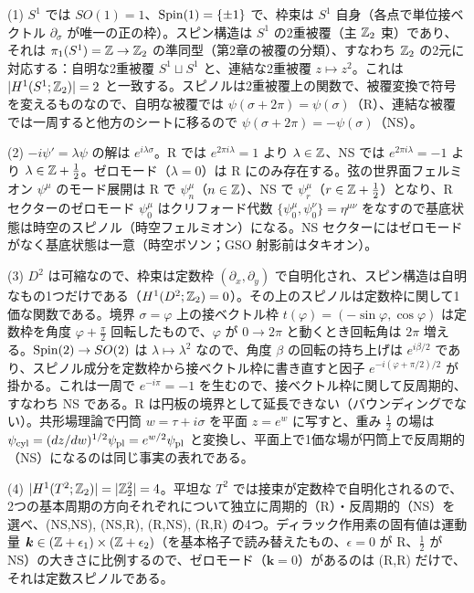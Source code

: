\begin{solution}
(1) $S^1$ では $SO(1)=1$、$\operatorname{Spin}(1)=\{\pm1\}$ で、枠束は $S^1$ 自身（各点で単位接ベクトル $\partial_\sigma$ が唯一の正の枠）。スピン構造は $S^1$ の2重被覆（主 $\mathbb{Z}_2$ 束）であり、それは $\pi_1(S^1)=\mathbb{Z}\to\mathbb{Z}_2$ の準同型（第2章の被覆の分類）、すなわち $\mathbb{Z}_2$ の2元に対応する：自明な2重被覆 $S^1\sqcup S^1$ と、連結な2重被覆 $z\mapsto z^2$。これは $\lvert H^1(S^1;\mathbb{Z}_2)\rvert=2$ と一致する。スピノルは2重被覆上の関数で、被覆変換で符号を変えるものなので、自明な被覆では $\psi(\sigma+2\pi)=\psi(\sigma)$（R）、連結な被覆では一周すると他方のシートに移るので $\psi(\sigma+2\pi)=-\psi(\sigma)$（NS）。

(2) $-i\psi'=\lambda\psi$ の解は $e^{i\lambda\sigma}$。R では $e^{2\pi i\lambda}=1$ より $\lambda\in\mathbb{Z}$、NS では $e^{2\pi i\lambda}=-1$ より $\lambda\in\mathbb{Z}+\tfrac12$。ゼロモード（$\lambda=0$）は R にのみ存在する。弦の世界面フェルミオン $\psi^\mu$ のモード展開は R で $\psi^\mu_n$（$n\in\mathbb{Z}$）、NS で $\psi^\mu_r$（$r\in\mathbb{Z}+\frac12$）となり、R セクターのゼロモード $\psi^\mu_0$ はクリフォード代数 $\{\psi_0^\mu,\psi_0^\nu\}=\eta^{\mu\nu}$ をなすので基底状態は時空のスピノル（時空フェルミオン）になる。NS セクターにはゼロモードがなく基底状態は一意（時空ボソン；GSO 射影前はタキオン）。

(3) $D^2$ は可縮なので、枠束は定数枠 $(\partial_x,\partial_y)$ で自明化され、スピン構造は自明なもの1つだけである（$H^1(D^2;\mathbb{Z}_2)=0$）。その上のスピノルは定数枠に関して1価な関数である。境界 $\sigma=\varphi$ 上の接ベクトル枠 $t(\varphi)=(-\sin\varphi,\cos\varphi)$ は定数枠を角度 $\varphi+\frac\pi2$ 回転したもので、$\varphi$ が $0\to2\pi$ と動くとき回転角は $2\pi$ 増える。$\operatorname{Spin}(2)\to SO(2)$ は $\lambda\mapsto\lambda^2$ なので、角度 $\beta$ の回転の持ち上げは $e^{i\beta/2}$ であり、スピノル成分を定数枠から接ベクトル枠に書き直すと因子 $e^{-i(\varphi+\pi/2)/2}$ が掛かる。これは一周で $e^{-i\pi}=-1$ を生むので、接ベクトル枠に関して反周期的、すなわち NS である。R は円板の境界として延長できない（バウンディングでない）。共形場理論で円筒 $w=\tau+i\sigma$ を平面 $z=e^w$ に写すと、重み $\frac12$ の場は $\psi_{\rm cyl}=(dz/dw)^{1/2}\psi_{\rm pl}=e^{w/2}\psi_{\rm pl}$ と変換し、平面上で1価な場が円筒上で反周期的（NS）になるのは同じ事実の表れである。

(4) $\lvert H^1(T^2;\mathbb{Z}_2)\rvert=\lvert\mathbb{Z}_2^2\rvert=4$。平坦な $T^2$ では接束が定数枠で自明化されるので、2つの基本周期の方向それぞれについて独立に周期的（R）・反周期的（NS）を選べ、(NS,NS), (NS,R), (R,NS), (R,R) の4つ。ディラック作用素の固有値は運動量 $\bm k\in(\mathbb{Z}+\epsilon_1)\times(\mathbb{Z}+\epsilon_2)$（を基本格子で読み替えたもの、$\epsilon=0$ が R、$\frac12$ が NS）の大きさに比例するので、ゼロモード（$\bm k=0$）があるのは (R,R) だけで、それは定数スピノルである。
\end{solution}

